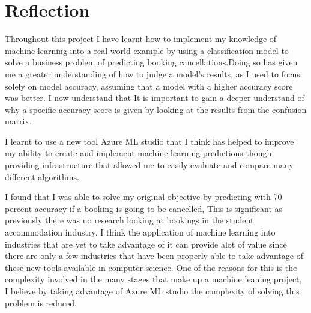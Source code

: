\chapter{Reflection}
\label{ch:reflection}
Throughout this project I have learnt how to implement my knowledge of machine learning into a real world example by using a classification model to solve a business problem of predicting booking cancellations.Doing so has given me a greater understanding of how to judge a model's results, as I used to focus solely on model accuracy, assuming that a model with a higher accuracy score was better. I now understand that It is important to gain a deeper understand of why a specific accuracy score is given by looking at the results from the confusion matrix.

I learnt to use a new tool Azure ML studio that I think has helped to improve my ability to create and implement machine learning predictions though providing infrastructure that allowed me to easily evaluate and compare many different algorithms.

I found that I was able to solve my original objective by predicting with 70 percent accuracy if a booking is going to be cancelled, This is significant as previously there was no research looking at bookings in the student accommodation industry. I think the application of machine learning into industries that are yet to take advantage of it can provide alot of value since there are only a few industries that have been properly able to take advantage of these new tools available in computer science. One of the reasons for this is the complexity involved in the many stages that make up a machine leaning project, I believe by taking advantage of Azure ML studio the complexity of solving this problem is reduced. 
